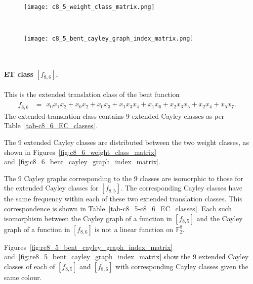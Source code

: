\documentclass[12pt,a4paper]{article}
\newcommand{\mb}[1]{\mathbb{#1}}
\newcommand{\F}{\mb{F}}
\begin{document}
\begin{figure}[!bhpt] %
\centering
\begin{minipage}{.48\textwidth}
  \centering
  \texttt{[image: c8\_5\_weight\_class\_matrix.png]}
  \label{fig:c8_5_weight_class_matrix}
\end{minipage}%
~~~~
\begin{minipage}{.48\textwidth}
  \centering
  \texttt{[image: c8\_5\_bent\_cayley\_graph\_index\_matrix.png]}
  \label{fig:c8_5_bent_cayley_graph_index_matrix}
\end{minipage}
\end{figure}
~
\newpage
\paragraph*{ET class $[f_{8,6}]$.}
%
%
This is the extended translation class of the bent function
\small{}
\begin{align*}
f_{ 8 , 6 } &=
\begin{array}{l}
x_{0} x_{1} x_{2} + x_{0} x_{2} + x_{0} x_{3} + x_{1} x_{3} x_{4} + x_{1} x_{6} + x_{2} x_{3} x_{5}
+ x_{2} x_{4} + x_{5} x_{7}.
\end{array}
\end{align*}
\normalsize{}
The extended translation class contains 9 extended Cayley classes as per Table~\ref{tab-c8_6_EC_classes}.

The 9 extended Cayley classes are distributed between the two weight classes,
as shown in Figures~\ref{fig:c8_6_weight_class_matrix} and~\ref{fig:c8_6_bent_cayley_graph_index_matrix}.

The 9 Cayley graphs corresponding to the 9 classes are isomorphic to those for the extended Cayley classes for $[f_{8,5}]$.
The corresponding Cayley classes have the same frequency within each of these two extended translation classes.
This correspondence is shown in Table~\ref{tab-c8_5-c8_6_EC_classes}.
Each such isomorphism between
the Cayley graph of a function in $[f_{8,5}]$ and
the Cayley graph of a function in $[f_{8,6}]$ is not a linear function on $\F_2^8$.

Figures~\ref{fig:re8_5_bent_cayley_graph_index_matrix} and~\ref{fig:re8_5_bent_cayley_graph_index_matrix}
show the 9 extended Cayley classes of each of $[f_{8,5}]$ and $[f_{8,6}]$ with corresponding Cayley classes
given the same colour.
\end{document}

